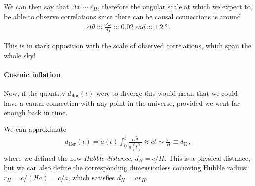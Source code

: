 \documentclass[main.tex]{subfiles}
\begin{document}
We can then say that \(\Delta x \sim r_H\), therefore the angular scale at which we expect to be able to observe correlations since there can be causal connections is around 
%
\begin{align}
\Delta \theta \approx \frac{ \Delta x}{d_A} \approx \SI{0.02}{rad} \approx \SI{1.2}{\degree}
\,.
\end{align}


This is in stark opposition with the scale of observed correlations, which span the whole sky! 







\paragraph{Cosmic inflation}

Now, if the quantity \(d _{\text{Hor}}(t)\) were to diverge this would mean that we could have a causal connection with any point in the universe, provided we went far enough back in time.

We can approximate 
%
\begin{align}
  d _{\text{Hor}} (t) = a(t) \int_0^{t} \frac{c \dd{\widetilde{t}} }{a(\widetilde{t})} \approx ct \sim \frac{c}{H} \equiv
  d _{\text{H}}
\,,
\end{align}
%
where we defined the new \emph{Hubble distance}, \(d_H = c/H\).
This is a physical distance, but we can also define the corresponding
dimensionless comoving Hubble radius: \(r_H = c/(Ha) = c / \dot{a} \), which satisfies \(d_H = a r_H\).
\end{document}
